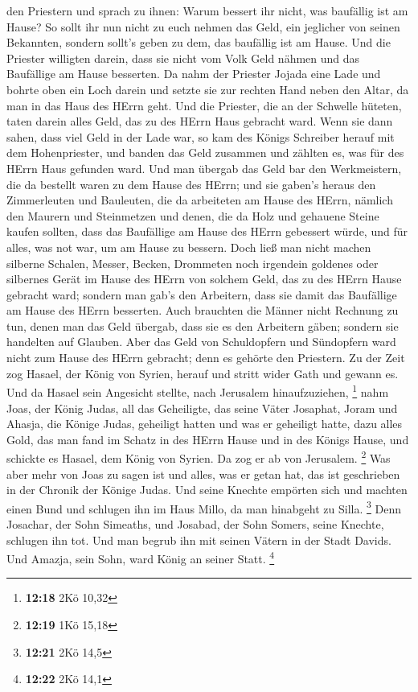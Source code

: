den Priestern und sprach zu ihnen: Warum bessert ihr nicht, was
baufällig ist am Hause? So sollt ihr nun nicht zu euch nehmen das Geld,
ein jeglicher von seinen Bekannten, sondern sollt's geben zu dem, das
baufällig ist am Hause.  Und die Priester willigten darein,
dass sie nicht vom Volk Geld nähmen und das Baufällige am Hause
besserten.  Da nahm der Priester Jojada eine Lade und
bohrte oben ein Loch darein und setzte sie zur rechten Hand neben den
Altar, da man in das Haus des HErrn geht. Und die Priester, die an der
Schwelle hüteten, taten darein alles Geld, das zu des HErrn Haus
gebracht ward.  Wenn sie dann sahen, dass viel Geld in der
Lade war, so kam des Königs Schreiber herauf mit dem Hohenpriester, und
banden das Geld zusammen und zählten es, was für des HErrn Haus gefunden
ward.  Und man übergab das Geld bar den Werkmeistern, die
da bestellt waren zu dem Hause des HErrn; und sie gaben's heraus den
Zimmerleuten und Bauleuten, die da arbeiteten am Hause des HErrn,
 nämlich den Maurern und Steinmetzen und denen, die da Holz
und gehauene Steine kaufen sollten, dass das Baufällige am Hause des
HErrn gebessert würde, und für alles, was not war, um am Hause zu
bessern.  Doch ließ man nicht machen silberne Schalen,
Messer, Becken, Drommeten noch irgendein goldenes oder silbernes Gerät
im Hause des HErrn von solchem Geld, das zu des HErrn Hause gebracht
ward;  sondern man gab's den Arbeitern, dass sie damit das
Baufällige am Hause des HErrn besserten.  Auch brauchten
die Männer nicht Rechnung zu tun, denen man das Geld übergab, dass sie
es den Arbeitern gäben; sondern sie handelten auf Glauben. 
Aber das Geld von Schuldopfern und Sündopfern ward nicht zum Hause des
HErrn gebracht; denn es gehörte den Priestern.  Zu der Zeit
zog Hasael, der König von Syrien, herauf und stritt wider Gath und
gewann es. Und da Hasael sein Angesicht stellte, nach Jerusalem
hinaufzuziehen, \footnote{\textbf{12:18} 2Kö 10,32}  nahm
Joas, der König Judas, all das Geheiligte, das seine Väter Josaphat,
Joram und Ahasja, die Könige Judas, geheiligt hatten und was er
geheiligt hatte, dazu alles Gold, das man fand im Schatz in des HErrn
Hause und in des Königs Hause, und schickte es Hasael, dem König von
Syrien. Da zog er ab von Jerusalem. \footnote{\textbf{12:19} 1Kö 15,18}
 Was aber mehr von Joas zu sagen ist und alles, was er
getan hat, das ist geschrieben in der Chronik der Könige Judas.
 Und seine Knechte empörten sich und machten einen Bund und
schlugen ihn im Haus Millo, da man hinabgeht zu Silla. \footnote{\textbf{12:21}
  2Kö 14,5}  Denn Josachar, der Sohn Simeaths, und Josabad,
der Sohn Somers, seine Knechte, schlugen ihn tot. Und man begrub ihn mit
seinen Vätern in der Stadt Davids. Und Amazja, sein Sohn, ward König an
seiner Statt. \footnote{\textbf{12:22} 2Kö 14,1}

